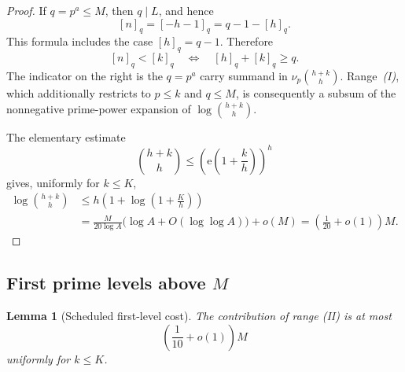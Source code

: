 \documentclass[11pt]{article}
\newtheorem{lemma}[theorem]{Lemma}
\theoremstyle{remark}
\newcommand{\e}{\mathrm e}
\begin{document}
\begin{proof}
If \(q=p^a\leq M\), then \(q\mid L\), and hence
\begin{equation}\label{eq:small-residue}
 [n]_q=[-h-1]_q=q-1-[h]_q.
\end{equation}
This formula includes the case \([h]_q=q-1\).  Therefore
\begin{equation}\label{eq:carry-identity}
 [n]_q<[k]_q
 \quad\Longleftrightarrow\quad
 [h]_q+[k]_q\geq q.
\end{equation}
The indicator on the right is the \(q=p^a\) carry summand in
\(\nu_p\binom{h+k}{h}\).  Range~\emph{(I)}, which additionally restricts to
\(p\leq k\) and \(q\leq M\), is consequently a subsum of the nonnegative
prime-power expansion of \(\log\binom{h+k}{h}\).

The elementary estimate
\[
 \binom{h+k}{h}\leq
 \left(\e\left(1+\frac{k}{h}\right)\right)^h
\]
gives, uniformly for \(k\leq K\),
\begin{align*}
 \log\binom{h+k}{h}
 &\leq h\left(1+\log\left(1+\frac Kh\right)\right)\\
 &=\frac{M}{20\log A}
   \bigl(\log A+O(\log\log A)\bigr)+o(M)
 =\left(\frac1{20}+o(1)\right)M.
\end{align*}
\end{proof}

\subsection{\texorpdfstring{First prime levels above \(M\)}{First prime levels above M}}

\begin{lemma}[Scheduled first-level cost]\label{lem:first-level}
The contribution of range \emph{(II)} is at most
\begin{equation}\label{eq:first-level-bound}
 \left(\frac1{10}+o(1)\right)M
\end{equation}
uniformly for \(k\leq K\).
\end{lemma}
\end{document}
